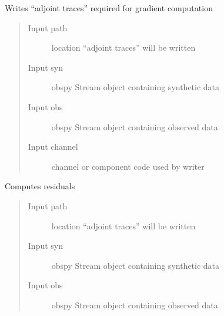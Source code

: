 \documentclass[letterpaper,10pt,english]{sphinxmanual}
\begin{document}
\begin{fulllineitems}
\begin{fulllineitems}
\begin{quote}
\begin{description}
\end{description}\end{quote}

\end{fulllineitems}


\begin{fulllineitems}
\label{\detokenize{ref/seisflows.preprocess:seisflows.preprocess.base.base.write_adjoint_traces}}
Writes “adjoint traces” required for gradient computation
\begin{quote}\begin{description}
\item[{Input path}] \leavevmode
location “adjoint traces” will be written

\item[{Input syn}] \leavevmode
obspy Stream object containing synthetic data

\item[{Input obs}] \leavevmode
obspy Stream object containing observed data

\item[{Input channel}] \leavevmode
channel or component code used by writer

\end{description}\end{quote}

\end{fulllineitems}


\begin{fulllineitems}
\label{\detokenize{ref/seisflows.preprocess:seisflows.preprocess.base.base.write_residuals}}
Computes residuals
\begin{quote}\begin{description}
\item[{Input path}] \leavevmode
location “adjoint traces” will be written

\item[{Input syn}] \leavevmode
obspy Stream object containing synthetic data

\item[{Input obs}] \leavevmode
obspy Stream object containing observed data

\end{description}\end{quote}

\end{fulllineitems}


\end{fulllineitems}
\end{document}
